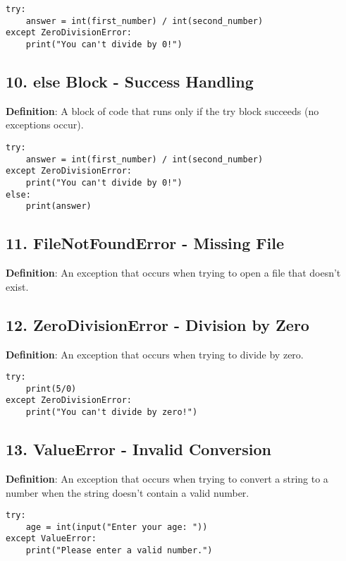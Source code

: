 \begin{lstlisting}
try:
    answer = int(first_number) / int(second_number)
except ZeroDivisionError:
    print("You can't divide by 0!")
\end{lstlisting}

\subsection*{10. else Block - Success Handling}
\textbf{Definition}: A block of code that runs only if the try block succeeds (no exceptions occur).

\begin{lstlisting}
try:
    answer = int(first_number) / int(second_number)
except ZeroDivisionError:
    print("You can't divide by 0!")
else:
    print(answer)
\end{lstlisting}

\subsection*{11. FileNotFoundError - Missing File}
\textbf{Definition}: An exception that occurs when trying to open a file that doesn't exist.



\subsection*{12. ZeroDivisionError - Division by Zero}
\textbf{Definition}: An exception that occurs when trying to divide by zero.

\begin{lstlisting}
try:
    print(5/0)
except ZeroDivisionError:
    print("You can't divide by zero!")
\end{lstlisting}

\subsection*{13. ValueError - Invalid Conversion}
\textbf{Definition}: An exception that occurs when trying to convert a string to a number when the string doesn't contain a valid number.

\begin{lstlisting}
try:
    age = int(input("Enter your age: "))
except ValueError:
    print("Please enter a valid number.")
\end{lstlisting}

